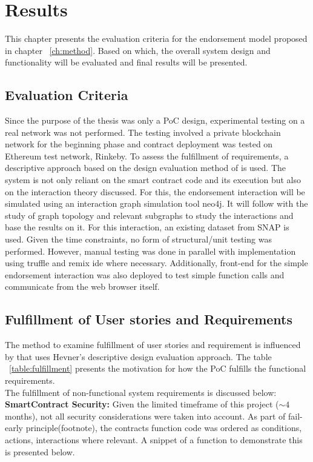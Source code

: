 \chapter{Results} \label{ch:results}
This chapter presents the evaluation criteria for the endorsement model
proposed in chapter ~\ref{ch:method}. Based on which, the overall system design
and functionality will be evaluated and final results will be presented. 

\section{Evaluation Criteria}
Since the purpose of the thesis was only a PoC design, experimental testing on
a real network was not performed. The testing involved a private blockchain
network for the beginning phase and contract deployment was tested on Ethereum
test network, Rinkeby.  To assess the fulfillment of requirements, a
descriptive approach based on the design evaluation method of
\cite{hevner2010design} is used. The system is not only reliant on the smart
contract code and its execution but also on the interaction theory discussed.
For this, the endorsement interaction will be simulated using an interaction
graph simulation tool neo4j. It will follow with the study of graph topology
and relevant subgraphs to study the interactions and base the results on it.
For this interaction, an existing dataset from SNAP\cite{snapnets} is used.
Given the time constraints, no form of structural/unit testing was performed.
However, manual testing was done in parallel with implementation using truffle
and remix ide where necessary. Additionally, front-end for the simple
endorsement interaction was also deployed to test simple function calls and
communicate from the web browser itself. 

\section{Fulfillment of User stories and Requirements}
The method to examine fulfillment of user stories and requirement is influenced
by \cite{Bergquist1107612} that uses Hevner's descriptive design evaluation
approach\cite{hevner2010design}. The table ~\ref{table:fulfillment} presents
the motivation for how the PoC fulfills the functional requirements.\\ 

The fulfillment of non-functional system requirements is discussed below:\\
\textbf{SmartContract Security:} Given the limited timeframe of this project
($\sim{4}$ months), not all security considerations were taken into account. As
part of fail-early principle(footnote), the contracts function code was ordered
as conditions, actions, interactions where relevant. A snippet of a function to
demonstrate this is presented below. 

